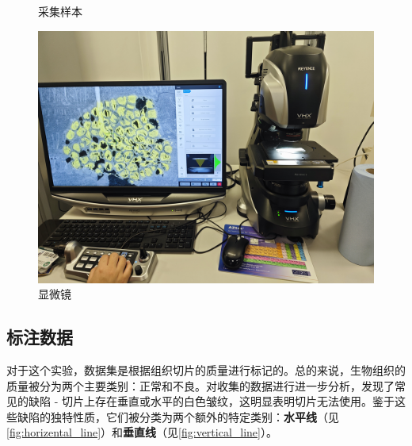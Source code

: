 \begin{figure}[htbp]
\begin{minipage}{0.3\textwidth}
        \caption{采集样本}
        \label{fig:采集样本}
    \end{minipage}
    \begin{minipage}{0.35\textwidth}
        \centering
        \includegraphics[width=\textwidth]{./fig/显微镜.jpg}
        \caption{显微镜}
        \label{fig:显微镜}
    \end{minipage}
\end{figure}





\subsection{标注数据}

对于这个实验，数据集是根据组织切片的质量进行标记的。总的来说，生物组织的质量被分为两个主要类别：正常和不良。对收集的数据进行进一步分析，发现了常见的缺陷 - 切片上存在垂直或水平的白色皱纹，这明显表明切片无法使用。鉴于这些缺陷的独特性质，它们被分类为两个额外的特定类别：\textbf{水平线}（见\autoref{fig:horizental_line}）和\textbf{垂直线}（见\autoref{fig:vertical_line}）。

